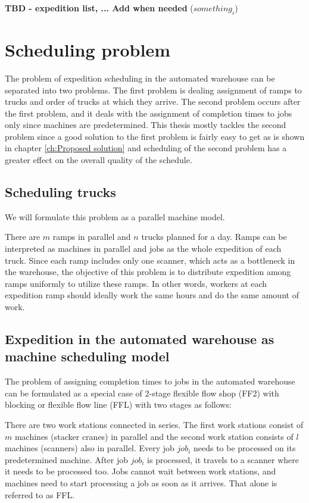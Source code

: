 \documentclass{ctuthesis}
\begin{document}
\noindent \textbf{TBD - expedition list, ... Add when needed} ($something_i$)


\section{Scheduling problem}
 
 The problem of expedition scheduling in the automated warehouse can be separated into two problems. The first problem is dealing assignment of ramps to trucks and order of trucks at which they arrive. The second problem occurs after the first problem, and it deals with the assignment of completion times to jobs only since machines are predetermined. This thesis mostly tackles the second problem since a good solution to the first problem is fairly easy to get as is shown in chapter \ref{ch:Proposed solution} and scheduling of the second problem has a greater effect on the overall quality of the schedule.
 
 \subsection{Scheduling trucks}
 
 We will formulate this problem as a parallel machine model.
 
 There are $m$ ramps in parallel and $n$ trucks planned for a day. Ramps can be interpreted as machines in parallel and jobs as the whole expedition of each truck. Since each ramp includes only one scanner, which acts as a bottleneck in the warehouse, the objective of this problem is to distribute expedition among ramps uniformly to utilize these ramps. In other words, workers at each expedition ramp should ideally work the same hours and do the same amount of work.
 
\subsection{Expedition in the automated warehouse as machine scheduling model}

The problem of assigning completion times to jobs in the automated warehouse can be formulated as a special case of 2-stage flexible flow shop (FF2) with blocking or flexible flow line (FFL) with two stages as follows:

There are two work stations connected in series. The first work stations consist of $m$ machines (stacker cranes) in parallel and the second work station consists of $l$ machines (scanners) also in parallel. Every job $job_i$ needs to be processed on its predetermined machine. After job $job_i$ is processed, it travels to a scanner where it needs to be processed too. Jobs cannot wait between work stations, and machines need to start processing a job as soon as it arrives. That alone is referred to as FFL.
\end{document}
